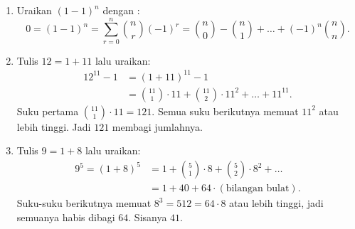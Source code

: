 \documentclass[12pt]{scrartcl}
\begin{document}
\begin{enumerate}[resume]
	\item Uraikan $(1 - 1)^n$ dengan :
	\[ 0 = (1 - 1)^n = \sum_{r=0}^{n} \binom{n}{r}(-1)^r
	= \binom{n}{0} - \binom{n}{1} + \dots + (-1)^n\binom{n}{n}. \]

	\item Tulis $12 = 1 + 11$ lalu uraikan:
	\begin{align*}
	12^{11} - 1 &= (1 + 11)^{11} - 1 \\
	&= \binom{11}{1} \cdot 11 + \binom{11}{2} \cdot 11^2 + \dots + 11^{11}.
	\end{align*}
	Suku pertama $\binom{11}{1} \cdot 11 = 121$.
	Semua suku berikutnya memuat $11^2$ atau lebih tinggi.
	Jadi $121$ membagi jumlahnya.

	\item Tulis $9 = 1 + 8$ lalu uraikan:
	\begin{align*}
	9^5 = (1 + 8)^5 &= 1 + \binom{5}{1} \cdot 8 + \binom{5}{2} \cdot 8^2 + \dots \\
	&= 1 + 40 + 64 \cdot (\text{bilangan bulat}).
	\end{align*}
	Suku-suku berikutnya memuat $8^3 = 512 = 64 \cdot 8$ atau lebih tinggi,
	jadi semuanya habis dibagi $64$. Sisanya $41$.
\end{enumerate}
\end{document}
